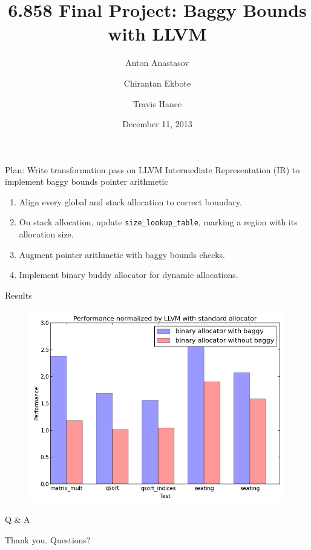 \documentclass{beamer}
\title[Baggy Bounds with LLVM]{6.858 Final Project: Baggy Bounds with LLVM}
\author{Anton Anastasov \and
Chirantan Ekbote \and
  Travis Hance
}
\date{December 11, 2013}
\begin{document}
\frame{\titlepage}

\begin{frame}{Plan: Write transformation pass on LLVM Intermediate Representation (IR) to implement baggy bounds pointer arithmetic}
\begin{enumerate}
\item Align every global and stack allocation to correct boundary.
\item On stack allocation, update \texttt{size\_lookup\_table}, marking a region with its allocation size.
\item Augment pointer arithmetic with baggy bounds checks.
\item Implement binary buddy allocator for dynamic allocations.
\end{enumerate}
\end{frame}
\begin{frame}{Results}
\begin{figure}[p]
\centering
\graphicspath{ {../test/} }
\includegraphics[scale=0.45]{figure_1.png}
\end{figure}
\end{frame}

\begin{frame}{Q \& A}

{\LARGE Thank you. Questions?}
\end{frame}
\end{document}
